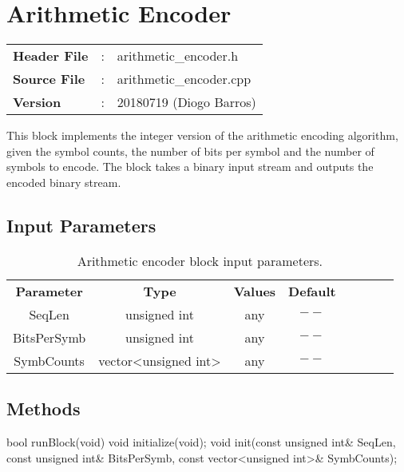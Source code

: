 \clearpage

\section{Arithmetic Encoder}

\begin{tcolorbox}	
	\begin{tabular}{p{2.75cm} p{0.2cm} p{10.5cm}} 	
		\textbf{Header File}   &:& arithmetic\_encoder.h \\
		\textbf{Source File}   &:& arithmetic\_encoder.cpp \\
        \textbf{Version}       &:& 20180719 (Diogo Barros) \\
	\end{tabular}
\end{tcolorbox}

This block implements the integer version of the arithmetic encoding algorithm, given the symbol counts, the number of bits per symbol and the number of symbols to encode.
The block takes a binary input stream and outputs the encoded binary stream.

\subsection*{Input Parameters}

\begin{table}[h]
	\centering
	\begin{tabular}{|c|c|c|c|cccc}
		\cline{1-4}
		\textbf{Parameter} & \textbf{Type} & \textbf{Values} & \textbf{Default} & \\ \cline{1-5}
        SeqLen 	   & unsigned int 		  & any & $--$ 	\\ \cline{1-5}
		BitsPerSymb& unsigned int         & any & $--$ 	\\ \cline{1-5}	
	    SymbCounts & vector<unsigned int> & any & $--$  \\ \cline{1-5}	
	\end{tabular}
	\caption{Arithmetic encoder block input parameters.}
	\label{table:arith_enc_in_par}
\end{table}

\subsection*{Methods}

	bool runBlock(void)
\bigbreak
void initialize(void);
\bigbreak
void init(const unsigned int\& SeqLen, const unsigned int\& BitsPerSymb,
const vector<unsigned int>\& SymbCounts);
\bigbreak


